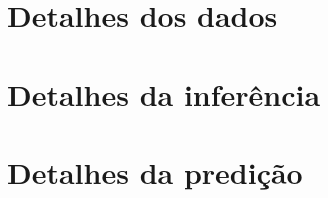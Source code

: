 \documentclass[12pt,twoside]{book}
\numberwithin{equation}{chapter} %
\begin{document}









\appendix
\chapter{Detalhes dos dados}\label{apx:cap_dados}


\chapter{Detalhes da inferência}\label{apx:cap_inferencia}


\chapter{Detalhes da predição}\label{apx:cap_predicao}



\clearpage{}
{}
 

\end{document}
